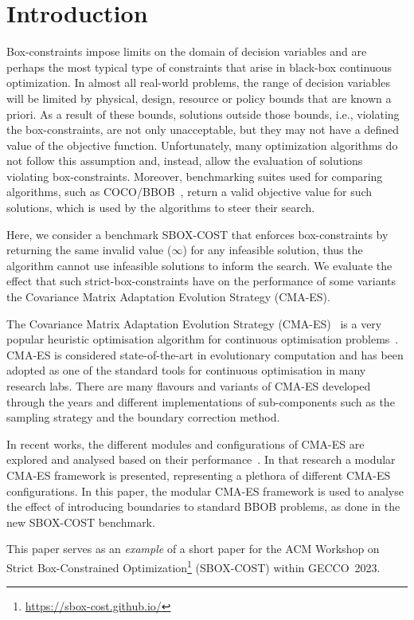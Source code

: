 \documentclass[sigconf=true, nonacm=false, review=true, anonymous = false,screen=true]{acmart}
\begin{document}
\section{Introduction}
Box-constraints impose limits on the domain of decision variables and are perhaps the most typical type of constraints that arise in black-box continuous optimization. In almost all real-world problems, the range of decision variables will be limited by physical, design, resource or policy bounds that are known a priori. As a result of these bounds, solutions outside those bounds, i.e., violating the box-constraints, are not only unacceptable, but they may not have a defined value of the objective function. Unfortunately, many optimization algorithms do not follow this assumption and, instead, allow the evaluation of solutions violating box-constraints. Moreover, benchmarking suites used for comparing algorithms, such as COCO/BBOB~\cite{hansen2020coco}, return a valid objective value for such solutions, which is used by the algorithms to steer their search.

Here, we consider a benchmark SBOX-COST that enforces box-constraints by returning the same invalid value ($\infty$) for any infeasible solution, thus the algorithm cannot use infeasible solutions to inform the search. We evaluate the effect that such strict-box-constraints have on the performance of some variants the Covariance Matrix Adaptation Evolution Strategy (CMA-ES).

The Covariance Matrix Adaptation Evolution Strategy (CMA-ES)~\cite{Hansen.1996} is a very popular heuristic optimisation algorithm for continuous optimisation problems~\cite{vermetten_gecco2022}. CMA-ES is considered state-of-the-art in evolutionary computation and has been adopted as one of the standard tools for continuous optimisation in many research labs. There are many flavours and variants of CMA-ES developed through the years and different implementations of sub-components such as the sampling strategy and the boundary correction method.

In recent works, the different modules and configurations of CMA-ES are explored and analysed based on their performance~\cite{de2021tuning}. In that research a modular CMA-ES framework is presented, representing a plethora of different CMA-ES configurations. In this paper, the modular CMA-ES framework is used to analyse the effect of introducing boundaries to standard BBOB problems, as done in the new SBOX-COST benchmark. 

This paper serves as an \textit{example} of a short paper for the ACM Workshop on Strict Box-Constrained Optimization\footnote{\url{https://sbox-cost.github.io/}} (SBOX-COST) within GECCO~2023.
\end{document}
